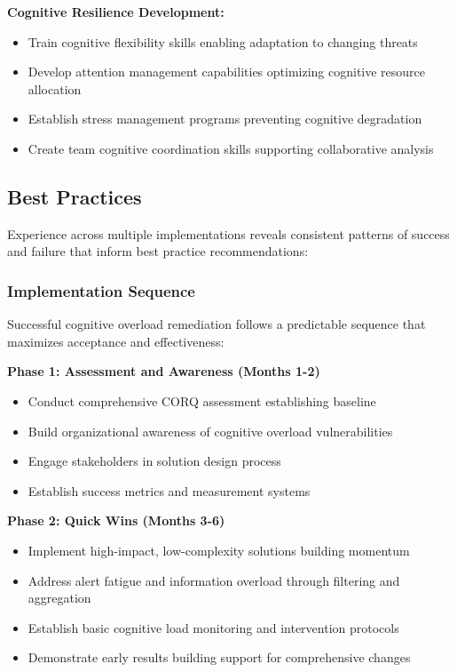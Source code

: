 \documentclass[11pt,a4paper]{article}
\begin{document}
\textbf{Cognitive Resilience Development:}
\begin{itemize}
\item Train cognitive flexibility skills enabling adaptation to changing threats
\item Develop attention management capabilities optimizing cognitive resource allocation
\item Establish stress management programs preventing cognitive degradation
\item Create team cognitive coordination skills supporting collaborative analysis
\end{itemize}

\subsection{Best Practices}

Experience across multiple implementations reveals consistent patterns of success and failure that inform best practice recommendations:

\subsubsection{Implementation Sequence}

Successful cognitive overload remediation follows a predictable sequence that maximizes acceptance and effectiveness:

\textbf{Phase 1: Assessment and Awareness (Months 1-2)}
\begin{itemize}
\item Conduct comprehensive CORQ assessment establishing baseline
\item Build organizational awareness of cognitive overload vulnerabilities
\item Engage stakeholders in solution design process
\item Establish success metrics and measurement systems
\end{itemize}

\textbf{Phase 2: Quick Wins (Months 3-6)}
\begin{itemize}
\item Implement high-impact, low-complexity solutions building momentum
\item Address alert fatigue and information overload through filtering and aggregation
\item Establish basic cognitive load monitoring and intervention protocols
\item Demonstrate early results building support for comprehensive changes
\end{itemize}
\end{document}
